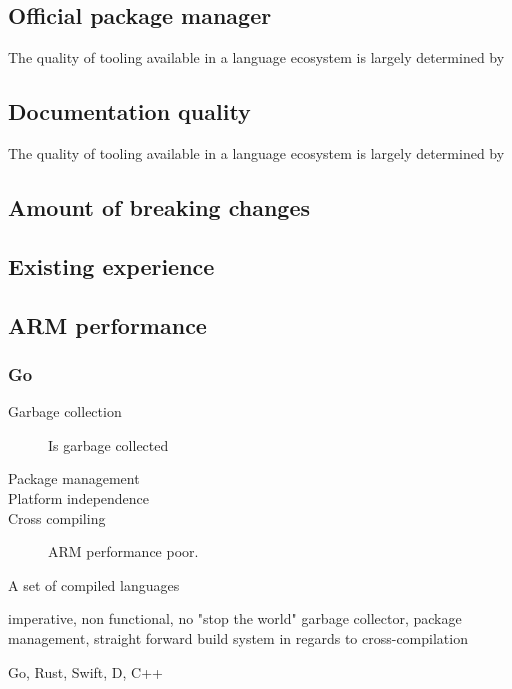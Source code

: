 \subsection{Official package manager}
The quality of tooling available in a language ecosystem is largely determined by 

\subsection{Documentation quality}
The quality of tooling available in a language ecosystem is largely determined by 

\subsection{Amount of breaking changes}


\subsection{Existing experience}


\subsection{ARM performance}


\subsubsection{Go}
\begin{description} 
\item [Garbage collection] 
Is garbage collected
\item [Package management]
\item [Platform independence] 

\item [Cross compiling]
ARM performance poor.

\end{description}

A set of compiled languages 

imperative, non functional, no "stop the world" garbage collector, package management, straight forward build system in regards to cross-compilation

Go, Rust, Swift, D, C++


